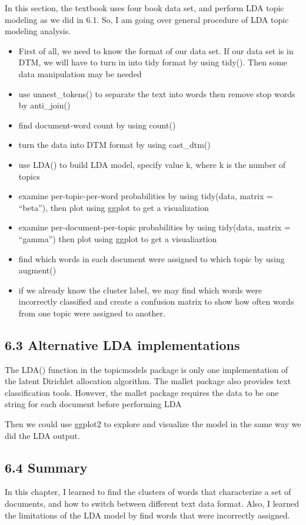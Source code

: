 \documentclass[]{article}
\providecommand{\tightlist}{%
  \setlength{\itemsep}{0pt}\setlength{\parskip}{0pt}}
\begin{document}
In this section, the textbook uses four book data set, and perform LDA
topic modeling as we did in 6.1. So, I am going over general procedure
of LDA topic modeling analysis.

\begin{itemize}
\tightlist
\item
  First of all, we need to know the format of our data set. If our data
  set is in DTM, we will have to turn in into tidy format by using
  tidy(). Then some data manipulation may be needed
\item
  use unnest\_tokens() to separate the text into words then remove stop
  words by anti\_join()
\item
  find document-word count by using count()
\item
  turn the data into DTM format by using cast\_dtm()
\item
  use LDA() to build LDA model, specify value k, where k is the number
  of topics
\item
  examine per-topic-per-word probabilities by using tidy(data, matrix =
  ``beta''), then plot using ggplot to get a visualization
\item
  examine per-document-per-topic probabilities by using tidy(data,
  matrix = ``gamma'') then plot using ggplot to get a visualiaztion
\item
  find which words in each document were assigned to which topic by
  using augment()
\item
  if we already know the cluster label, we may find which words were
  incorrectly classified and create a confusion matrix to show how often
  words from one topic were assigned to another.
\end{itemize}

\hypertarget{alternative-lda-implementations}{%
\subsection{6.3 Alternative LDA
implementations}\label{alternative-lda-implementations}}

The LDA() function in the topicmodels package is only one implementation
of the latent Dirichlet allocation algorithm. The mallet package also
provides text classification tools. However, the mallet package requires
the data to be one string for each document before performing LDA

Then we could use ggplot2 to explore and visualize the model in the same
way we did the LDA output.

\hypertarget{summary-1}{%
\subsection{6.4 Summary}\label{summary-1}}

In this chapter, I learned to find the clusters of words that
characterize a set of documents, and how to switch between different
text data format. Also, I learned the limitations of the LDA model by
find words that were incorrectly assigned.
\end{document}
